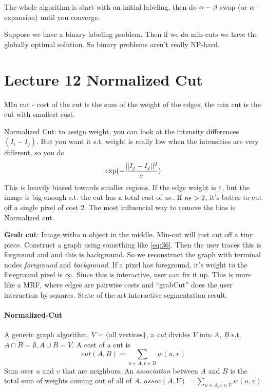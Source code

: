 The whole algorithm is start with an initial labeling, then do
$\alpha-\beta$ swap (or $\alpha$-expansion) until you converge.

Suppose we have a binary labeling problem. Then if we do min-cuts we
have the globally optimal solution. So binary problems aren't really NP-hard.

\pagebreak

\section{Lecture 12 Normalized Cut}
\label{sec:lecture-12}
MIn cut - cost of the cut is the sum of the weight of the edges, the
min cut is the cut with smallest cost. 

Normalized Cut: to assign weight, you can look at the intensity
differences $(I_i - I_j)$. But you want it s.t. weight is really low when the
intensities are very different, so you do 
\begin{equation}
  \label{eq:36}
\exp(-\frac{||I_j - I_j||^2}{\sigma})  
\end{equation}
This is heavily biased towards smaller regions. If the edge weight is
$\epsilon$, but the image is big enough s.t. the cut has a total cost of
$n\epsilon$. If $n\epsilon > 2$, it's better to cut off a single pixel of cost
2. The most influencial way to remove the bias is Normalized cut.

\textbf{Grab cut}: Image witha n object in the middle. Min-cut will
just cut off a tiny piece. Construct a graph using something like
\eqref{eq:36}. Then the user traces this is forground and and this is
background. So we reconstruct the graph with terminal nodes
\emph{foreground} and \emph{background}. If a pixel has foreground,
it's weight to the foreground pixel is $\infty$. Since this is
interactive, user can fix it up. This is more like a MRF, where edges
are pairwise costs and ``grabCut'' does the user interaction by
squares. State of the art interactive segmentation result.

\paragraph{Normalized-Cut}
A generic graph algorithm. $V = \{ \text{all vertices}\}$, a \emph{cut
} divides $V$ into $A$, $B$ s.t. $A\cap B = \emptyset, A\cup B = V$. A
cost of  a cut is
\begin{equation}
  \label{eq:37}
cut(A,B) = \sum_{u\in A, v\in B}w(u,v)
\end{equation}
Sum over $u$ and $v$ that are neighbors.
An \emph{association} between $A$ and $B$ is the total sum of weights
coming out of all of $A$.
$assoc(A,V) = \sum_{u\in A, v\in V}w(u,v)$

